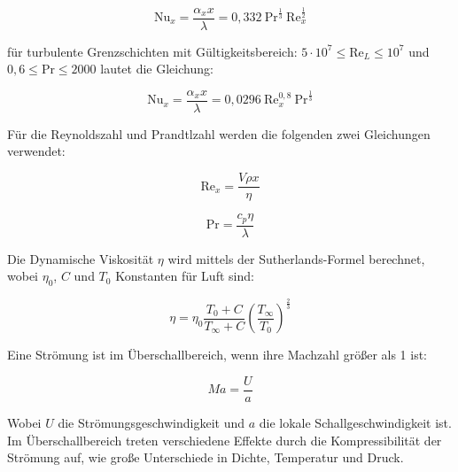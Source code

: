 \begin{equation}
  \label{eq:nusselt_laminar}
  \text{Nu}_x = \frac{\alpha_x x}{\lambda} = 0,332 \ \text{Pr}^{\frac{1}{3}} \ \text{Re}_x^{\frac{1}{2}}
\end{equation}

für turbulente Grenzschichten mit Gültigkeitsbereich: $5 \cdot 10^7 \leq \text{Re}_L \leq 10^7$ und $ 0,6 \leq \text{Pr} \leq 2000$ lautet die Gleichung:

\begin{equation}
  \label{eq:nusselt_turbulent}
  \text{Nu}_x = \frac{\alpha_x x}{\lambda} = 0,0296 \ \text{Re}_x^{0,8} \ \text{Pr}^{\frac{1}{3}}
\end{equation}

Für die Reynoldszahl und Prandtlzahl werden die folgenden zwei Gleichungen verwendet:

\noindent\begin{minipage}{.5\linewidth}
  \begin{equation}
    \label{eq:reynolds}
    \text{Re}_x = \frac{V \rho x}{\eta}
  \end{equation}
\end{minipage}%
\begin{minipage}{.5\linewidth}
  \begin{equation}
    \label{eq:prandtl}
    \text{Pr} = \frac{c_p \eta}{\lambda}
  \end{equation}
\end{minipage}

Die Dynamische Viskosität $\eta$ wird mittels der Sutherlands-Formel berechnet, wobei $\eta_0$, $C$ und $T_0$ Konstanten für Luft sind:

\begin{equation}
  \label{eq:dynamische_viskositaet}
  \eta = \eta_0 \frac{T_0 + C}{T_{\infty} + C} {\left( \frac{T_{\infty}}{T_0} \right)}^{\frac{2}{3}}
\end{equation}

Eine Strömung ist im Überschallbereich, wenn ihre Machzahl größer als 1 ist:

\begin{equation}
  \label{eq:machzahl}
  Ma = \frac{U}{a}
\end{equation}

Wobei $U$ die Strömungsgeschwindigkeit und $a$ die lokale Schallgeschwindigkeit ist. Im Überschallbereich treten verschiedene
Effekte durch die Kompressibilität der Strömung auf, wie große Unterschiede in Dichte, Temperatur und Druck.

